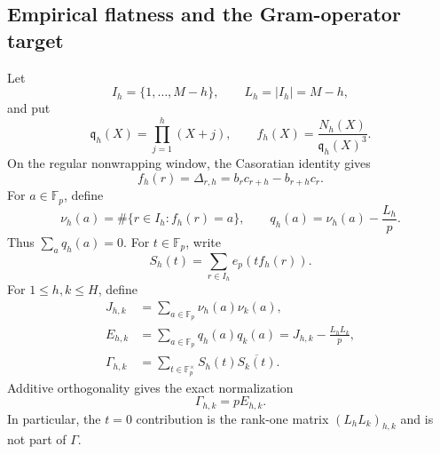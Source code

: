 \subsection{Empirical flatness and the Gram-operator target}
\label{gram-subsection}

Let
\[
 I_h=\{1,\ldots,M-h\},\qquad L_h=|I_h|=M-h,
\]
and put
\[
 \mathfrak q_h(X)=\prod_{j=1}^h(X+j),\qquad
 f_h(X)=\frac{N_h(X)}{\mathfrak q_h(X)^3}.
\]
On the regular nonwrapping window, the Casoratian identity gives
\[
 f_h(r)=\Delta_{r,h}
 =b_rc_{r+h}-b_{r+h}c_r.
\]
For $a\in\mathbb F_p$, define
\[
 \nu_h(a)=\#\{r\in I_h:f_h(r)=a\},\qquad
 q_h(a)=\nu_h(a)-\frac{L_h}{p}.
\]
Thus $\sum_aq_h(a)=0$.  For $t\in\mathbb F_p$, write
\[
 S_h(t)=\sum_{r\in I_h}e_p(tf_h(r)).
\]
For $1\le h,k\le H$, define
\begin{align}
 J_{h,k}
 &=\sum_{a\in\mathbb F_p}\nu_h(a)\nu_k(a),
 \label{gram-J-def}\\
 E_{h,k}
 &=\sum_{a\in\mathbb F_p}q_h(a)q_k(a)
 =J_{h,k}-\frac{L_hL_k}{p},
 \label{gram-E-def}\\
 \Gamma_{h,k}
 &=\sum_{t\in\mathbb F_p^\times}
   S_h(t)\overline{S_k(t)}.
 \label{gram-Gamma-def}
\end{align}
Additive orthogonality gives the exact normalization
\begin{equation}
 \boxed{\Gamma_{h,k}=pE_{h,k}.}
 \label{gram-fourier-normalization}
\end{equation}
In particular, the $t=0$ contribution is the rank-one matrix
$(L_hL_k)_{h,k}$ and is not part of $\Gamma$.

